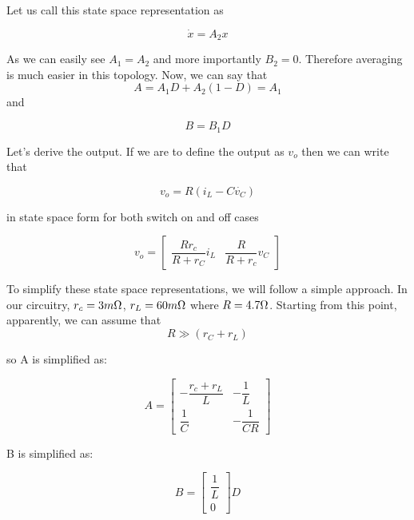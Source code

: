 Let us call this state space representation as

$$ \Dot{x} = A_2 x$$

As we can easily see $A_1 = A_2$ and more importantly $B_2 = 0$. Therefore averaging is much easier in this topology. Now, we can say that
\begin{equation}
    A = A_1D + A_2(1-D) = A_1
\end{equation}
and

\begin{equation}
    B = B_1D
\end{equation}

Let's derive the output. If we are to define the output as $v_o$ then we can write that

\begin{equation}
    v_o = R(i_L - C\Dot{v_C})
\end{equation}

in state space form for both switch on and off cases

\begin{equation}
    v_o = \begin{bmatrix}
    \dfrac{R r_c}{R+r_C}i_L & \dfrac{R}{R+r_c}v_C
    \end{bmatrix}
\end{equation}

To simplify these state space representations, we will follow a simple approach. In our circuitry, $r_c = 3 m\ohm$, $r_L = 60 m\ohm$ where $R = 4.7 \ohm$. Starting from this point, apparently, we can assume that
\begin{equation}
R \gg (r_C + r_L)
\end{equation}

so A is simplified as:

\begin{equation}
    A = \begin{bmatrix}
 -\dfrac{r_c + r_L}{L} & -\dfrac{1}{L} \\
 \dfrac{1}{C} & -\dfrac{1}{CR} 
\end{bmatrix}
\end{equation}

B is simplified as:

\begin{equation}
    B = \begin{bmatrix} 
 \dfrac{1}{L} \\ 0 
\end{bmatrix}
D
\end{equation}

